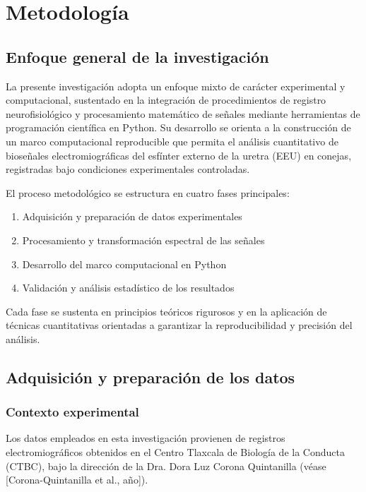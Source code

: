 \chapter{Metodología}
\label{Metodologia}

\section{Enfoque general de la investigación}
La presente investigación adopta un enfoque mixto de carácter experimental y computacional, sustentado en la integración de procedimientos de registro neurofisiológico y procesamiento matemático de señales mediante herramientas de programación científica en Python. Su desarrollo se orienta a la construcción de un marco computacional reproducible que permita el análisis cuantitativo de bioseñales electromiográficas del esfínter externo de la uretra (EEU) en conejas, registradas bajo condiciones experimentales controladas.

El proceso metodológico se estructura en cuatro fases principales:

\begin{enumerate}
	\item Adquisición y preparación de datos experimentales
	\item Procesamiento y transformación espectral de las señales
	\item Desarrollo del marco computacional en Python
	\item Validación y análisis estadístico de los resultados
\end{enumerate}

Cada fase se sustenta en principios teóricos rigurosos y en la aplicación de técnicas cuantitativas orientadas a garantizar la reproducibilidad y precisión del análisis.

\section{Adquisición y preparación de los datos}
\subsection{Contexto experimental}
Los datos empleados en esta investigación provienen de registros electromiográficos obtenidos en el Centro Tlaxcala de Biología de la Conducta (CTBC), bajo la dirección de la Dra. Dora Luz Corona Quintanilla (véase [Corona-Quintanilla et al., año]).

